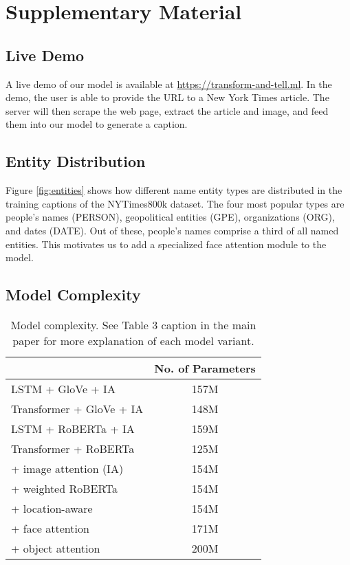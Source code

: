
\section{Supplementary Material}


\subsection{Live Demo}

A live demo of our model is available at
\href{https://transform-and-tell.ml}{https://transform-and-tell.ml}. In the
demo, the user is able to provide the URL to a New York Times article. The
server will then scrape the web page, extract the article and image, and
feed them into our model to generate a caption.

\subsection{Entity Distribution}

Figure \ref{fig:entities} shows how different name entity types are distributed
in the training captions of the NYTimes800k dataset. The four most popular
types are people's names (PERSON), geopolitical entities (GPE), organizations
(ORG), and dates (DATE). Out of these, people's names comprise a third of all
named entities. This motivates us to add a specialized face attention module to
the model.

\subsection{Model Complexity}

\begin{table}[h] \caption {Model complexity. See Table 3 caption in the main
   paper for more explanation of each model variant.}
   \label{tab:models}
   \centering
   \begin{tabularx}{\linewidth}{Xc}
      \toprule
                                                   & No. of Parameters \\
      \midrule
      LSTM + GloVe + IA             & 157M              \\
      Transformer + GloVe + IA        & 148M              \\
      LSTM + RoBERTa + IA     & 159M              \\
      \midrule
      Transformer + RoBERTa                       & 125M              \\
      \quad + image attention (IA)          & 154M              \\
      \quad\quad + weighted RoBERTa                & 154M              \\
      \quad\quad\quad + location-aware             & 154M              \\
      \quad\quad\quad\quad + face attention        & 171M              \\
      \quad\quad\quad\quad\quad + object attention & 200M              \\
      \bottomrule
   \end{tabularx}
\end{table}

